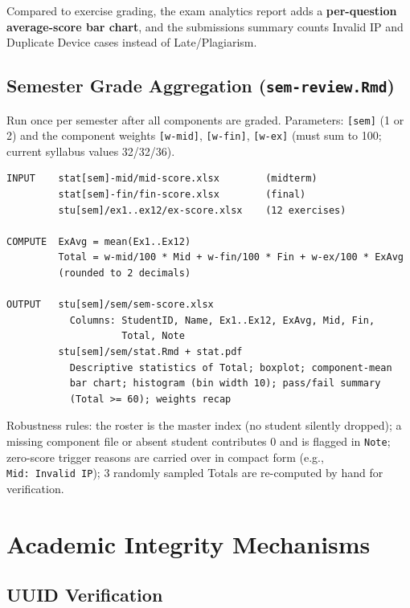 \documentclass[
]{article}
\begin{document}
Compared to exercise grading, the exam analytics report adds a
\textbf{per-question average-score bar chart}, and the submissions
summary counts Invalid IP and Duplicate Device cases instead of
Late/Plagiarism.

\subsection{\texorpdfstring{Semester Grade Aggregation
(\texttt{sem-review.Rmd})}{Semester Grade Aggregation (sem-review.Rmd)}}\label{semester-grade-aggregation-sem-review.rmd}

Run once per semester after all components are graded. Parameters:
\texttt{{[}sem{]}} (1 or 2) and the component weights
\texttt{{[}w-mid{]}}, \texttt{{[}w-fin{]}}, \texttt{{[}w-ex{]}} (must
sum to 100; current syllabus values 32/32/36).

\begin{verbatim}
INPUT    stat[sem]-mid/mid-score.xlsx        (midterm)
         stat[sem]-fin/fin-score.xlsx        (final)
         stu[sem]/ex1..ex12/ex-score.xlsx    (12 exercises)

COMPUTE  ExAvg = mean(Ex1..Ex12)
         Total = w-mid/100 * Mid + w-fin/100 * Fin + w-ex/100 * ExAvg
         (rounded to 2 decimals)

OUTPUT   stu[sem]/sem/sem-score.xlsx
           Columns: StudentID, Name, Ex1..Ex12, ExAvg, Mid, Fin,
                    Total, Note
         stu[sem]/sem/stat.Rmd + stat.pdf
           Descriptive statistics of Total; boxplot; component-mean
           bar chart; histogram (bin width 10); pass/fail summary
           (Total >= 60); weights recap
\end{verbatim}

Robustness rules: the roster is the master index (no student silently
dropped); a missing component file or absent student contributes 0 and
is flagged in \texttt{Note}; zero-score trigger reasons are carried over
in compact form (e.g., \texttt{Mid:\ Invalid\ IP}); 3 randomly sampled
Totals are re-computed by hand for verification.

\newpage

\section{Academic Integrity
Mechanisms}\label{academic-integrity-mechanisms}

\subsection{UUID Verification}\label{uuid-verification}
\end{document}
